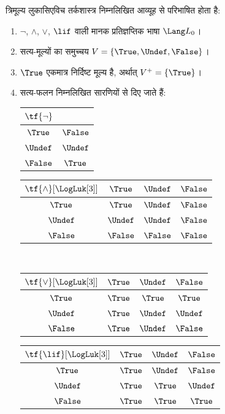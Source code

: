 \documentclass[../../../include/open-logic-section]{subfiles}
\begin{document}
\begin{defn}
त्रिमूल्य लुकासिएविच तर्कशास्त्र निम्नलिखित आव्यूह से परिभाषित होता है:
\begin{enumerate}
  \item $\lnot$, $\land$, $\lor$, $\lif$ वाली मानक प्रतिज्ञप्तिक भाषा
  $\Lang L_0$।
  \item सत्य-मूल्यों का समुच्चय $V = \{\True, \Undef, \False\}$।
  \item $\True$ एकमात्र निर्दिष्ट मूल्य है, अर्थात् $V^+ = \{\True\}$।
  \item सत्य-फलन निम्नलिखित सारणियों से दिए जाते हैं:
  \begin{center}
    \begin{tabular}{c|c} 
      $\tf{\lnot}$ & \\ 
      \hline  
      $\True$ & $\False$ \\ 
      $\Undef$ & $\Undef$ \\
      $\False$ & $\True$ 
    \end{tabular}
    \quad
    \begin{tabular}{c|ccc} 
      $\tf{\land}[\LogLuk[3]]$ & $\True$ & $\Undef$ & $\False$ \\ 
      \hline 
      $\True$ & $\True$ & $\Undef$ & $\False$ \\ 
      $\Undef$ & $\Undef$ & $\Undef$ & $\False$\\ 
      $\False$ & $\False$ & $\False$ & $\False$ 
    \end{tabular}
    \\[2ex]
    \begin{tabular}{c|ccc} 
      $\tf{\lor}[\LogLuk[3]]$ & $\True$ & $\Undef$ & $\False$ \\ 
      \hline 
      $\True$ & $\True$ & $\True$ & $\True$ \\ 
      $\Undef$ & $\True$ & $\Undef$ & $\Undef$ \\
      $\False$ & $\True$ & $\Undef$ & $\False$ 
    \end{tabular}
    \quad
    \begin{tabular}{c|ccc} 
      $\tf{\lif}[\LogLuk[3]]$ & $\True$ & $\Undef$ & $\False$ \\ 
      \hline 
      $\True$ & $\True$ & $\Undef$ & $\False$ \\ 
      $\Undef$ & $\True$ & $\True$ & $\Undef$  \\ 
      $\False$ & $\True$ & $\True$ & $\True$ 
    \end{tabular}
  \end{center} 
\end{enumerate}
\end{defn}
\end{document}
